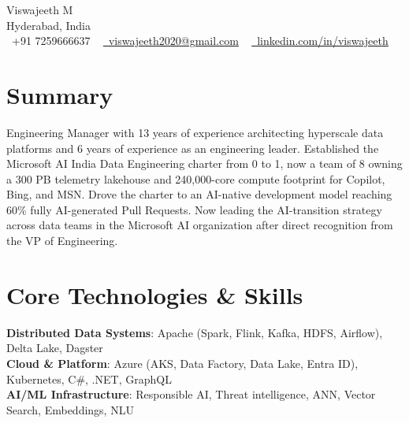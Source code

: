 \documentclass[letterpaper,11pt]{article}
\begin{document}

\begin{center}
    {\Huge \sffamily{}\selectfont Viswajeeth M} \\ \vspace{3pt}
    Hyderabad, India \\ \vspace{3pt}
    \small \raisebox{-0.1\height}\faPhone\ +91 7259666637 ~ \href{mailto:viswajeeth2020@gmail.com}{\raisebox{-0.2\height}\faEnvelope\  \underline{viswajeeth2020@gmail.com}} ~
    \href{https://www.linkedin.com/in/viswajeeth/}{\raisebox{-0.2\height}\faLinkedin\ \underline{linkedin.com/in/viswajeeth}}
\end{center}

\section{Summary}
\small{Engineering Manager with 13 years of experience architecting hyperscale data platforms and 6 years of experience as an engineering leader. Established the Microsoft AI India Data Engineering charter from 0 to 1, now a team of 8 owning a 300 PB telemetry lakehouse and 240,000-core compute footprint for Copilot, Bing, and MSN. Drove the charter to an AI-native development model reaching 60\% fully AI-generated Pull Requests. Now leading the AI-transition strategy across data teams in the Microsoft AI organization after direct recognition from the VP of Engineering.}

\section{Core Technologies \& Skills}
 \begin{itemize}[leftmargin=0.15in, label={}]
    \small{\item{
     \textbf{Distributed Data Systems}{: Apache (Spark, Flink, Kafka, HDFS, Airflow), Delta Lake, Dagster} \\
     \textbf{Cloud \& Platform}{: Azure (AKS, Data Factory, Data Lake, Entra ID), Kubernetes, C\#, .NET, GraphQL} \\
     \textbf{AI/ML Infrastructure}{: Responsible AI, Threat intelligence, ANN, Vector Search, Embeddings, NLU} \\
    }}
 \end{itemize}
\end{document}
